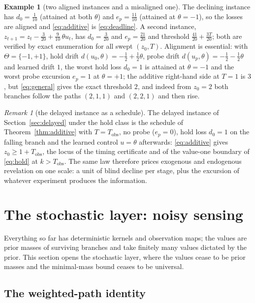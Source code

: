 \documentclass[11pt,a4paper]{article}
\theoremstyle{plain}
\theoremstyle{definition}
\newtheorem{example}[theorem]{Example}
\theoremstyle{remark}
\newtheorem{remark}[theorem]{Remark}
\newcommand{\Tobs}{T_{\mathrm{obs}}}
\newcommand{\tfr}[2]{\tfrac{#1}{#2}}
\begin{document}
\begin{example}[two aligned instances and a misaligned one]\label{ex:additive}
The declining instance has $d_0=\tfr1{10}$ (attained at both $\theta$) and $e_p=\tfr{11}{10}$ (attained at $\theta=-1$), so the losses are aligned and \eqref{eq:additive} is \eqref{eq:deadline}. A second instance, $z_{t+1}=z_t-\tfr3{20}+\tfr9{10}\,\theta u_t$, has $d_0=\tfr3{20}$ and $e_p=\tfr{21}{20}$ and threshold $\tfr{41}{20}+\tfr{3T}{20}$; both are verified by exact enumeration for all swept $(z_0,T)$. Alignment is essential: with $\Theta=\{-1,+1\}$, hold drift $d(u_0,\theta)=-\tfr12+\tfr12\theta$, probe drift $d(u_p,\theta)=-\tfr12-\tfr12\theta$ and learned drift $1$, the worst hold loss $d_0=1$ is attained at $\theta=-1$ and the worst probe excursion $e_p=1$ at $\theta=+1$; the additive right-hand side at $T=1$ is $3$, but \eqref{eq:general} gives the exact threshold $2$, and indeed from $z_0=2$ both branches follow the paths $(2,1,1)$ and $(2,2,1)$ and then rise.
\end{example}

\begin{remark}[the delayed instance as a schedule]\label{rem:delayedschedule}
The delayed instance of Section~\ref{sec:delayed} under the hold class is the schedule of Theorem~\ref{thm:additive} with $T=\Tobs$, no probe ($e_p=0$), hold loss $d_0=1$ on the falling branch and the learned control $u=\theta$ afterwards: \eqref{eq:additive} gives $z_0\ge1+\Tobs$, the locus of the timing certificate and of the value-one boundary of \eqref{eq:hold} at $k>\Tobs$. The same law therefore prices exogenous and endogenous revelation on one scale: a unit of blind decline per stage, plus the excursion of whatever experiment produces the information.
\end{remark}
\section{The stochastic layer: noisy sensing}\label{sec:stochastic}

Everything so far has deterministic kernels and observation maps; the values are prior masses of surviving branches and take finitely many values dictated by the prior. This section opens the stochastic layer, where the values cease to be prior masses and the minimal-mass bound ceases to be universal.

\subsection{The weighted-path identity}
\end{document}
